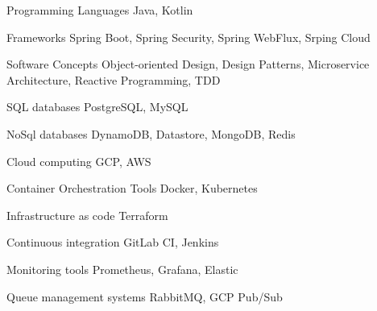
\begin{cvskills}

  \cvskill
    {Programming Languages} %
    {Java, Kotlin} %

  \cvskill
    {Frameworks} %
    {Spring Boot, Spring Security, Spring WebFlux, Srping Cloud} %

  \cvskill
    {Software Concepts} %
    {Object-oriented Design, Design Patterns, Microservice Architecture, Reactive Programming, TDD} %

  \cvskill
    {SQL databases} %
    {PostgreSQL, MySQL} %

  \cvskill
    {NoSql databases} %
    {DynamoDB, Datastore, MongoDB, Redis} %

  \cvskill
    {Cloud computing} %
    {GCP, AWS} %

  \cvskill
    {Container Orchestration Tools} %
    {Docker, Kubernetes} %

  \cvskill
    {Infrastructure as code} %
    {Terraform} %

  \cvskill
    {Continuous integration} %
    {GitLab CI, Jenkins} %

  \cvskill
    {Monitoring tools} %
    {Prometheus, Grafana, Elastic} %

  \cvskill
    {Queue management systems} %
    {RabbitMQ, GCP Pub/Sub} %


\end{cvskills}
